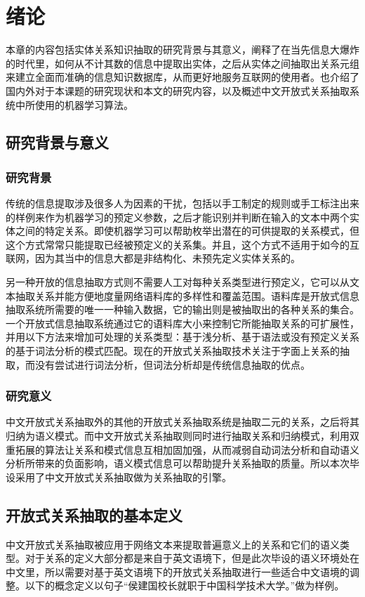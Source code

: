 \chapter{绪论}
\label{chap:introduction}

本章的内容包括实体关系知识抽取的研究背景与其意义，阐释了在当先信息大爆炸的时代里，如何从不计其数的信息中提取出实体，之后从实体之间抽取出关系元组来建立全面而准确的信息知识数据库，从而更好地服务互联网的使用者。也介绍了国内外对于本课题的研究现状和本文的研究内容，以及概述中文开放式关系抽取系统中所使用的机器学习算法。

\section{研究背景与意义}

\subsection{研究背景}

传统的信息提取涉及很多人为因素的干扰，包括以手工制定的规则或手工标注出来的样例来作为机器学习的预定义参数，之后才能识别并判断在输入的文本中两个实体之间的特定关系\citep{wang}。即使机器学习可以帮助枚举出潜在的可供提取的关系模式，但这个方式常常只能提取已经被预定义的关系集。并且，这个方式不适用于如今的互联网，因为其当中的信息大都是非结构化、未预先定义实体关系的。

另一种开放的信息抽取\citep{banko}方式则不需要人工对每种关系类型进行预定义，它可以从文本抽取关系并能方便地度量网络语料库的多样性和覆盖范围。语料库是开放式信息抽取系统所需要的唯一一种输入数据，它的输出则是被抽取出的各种关系的集合。一个开放式信息抽取系统通过它的语料库大小来控制它所能抽取关系的可扩展性，并用以下方法来增加可处理的关系类型：基于浅分析、基于语法或没有预定义关系的基于词法分析的模式匹配\citep{wu2010, naka2012, etz2011}。现在的开放式关系抽取技术关注于字面上关系的抽取，而没有尝试进行词法分析，但词法分析却是传统信息抽取的优点。

\subsection{研究意义}
中文开放式关系抽取外的其他的开放式关系抽取系统是抽取二元的关系，之后将其归纳为语义模式。而中文开放式关系抽取则同时进行抽取关系和归纳模式，利用双重拓展的算法让关系和模式信息互相加固加强，从而减弱自动词法分析和自动语义分析所带来的负面影响，语义模式信息可以帮助提升关系抽取的质量。所以本次毕设采用了中文开放式关系抽取做为关系抽取的引擎。

\section{开放式关系抽取的基本定义}
中文开放式关系抽取被应用于网络文本来提取普遍意义上的关系和它们的语义类型。对于关系的定义大部分都是来自于英文语境下，但是此次毕设的语义环境处在中文里，所以需要对基于英文语境下的开放式关系抽取进行一些适合中文语境的调整。以下的概念定义以句子“侯建国校长就职于中国科学技术大学。”做为样例。

